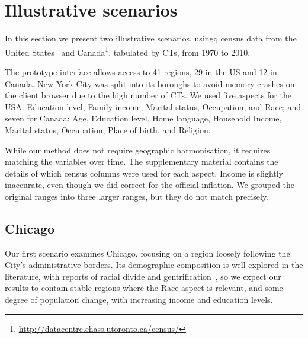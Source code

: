 \section{Illustrative scenarios}
\label{sec:study}

In this section we present two illustrative scenarios, usingq census data from
the United States~\citep{nhgis} and
Canada\footnote{\url{http://datacentre.chass.utoronto.ca/census/}}, tabulated by
CTs,  from 1970 to 2010. 

The prototype interface allows access to 41 regions, 29
in the US and 12 in Canada. New York City was split into its boroughs to avoid
memory crashes on the client browser due to the high number of CTs.  We used
five aspects for the USA: Education level, Family income, Marital status,
Occupation, and Race; and seven for Canada: Age, Education level, Home language,
Household Income, Marital status, Occupation, Place of birth, and Religion. 

While our method does not require geographic harmonisation, it requires matching
the variables over time. The supplementary material contains the details of
which census columns were used for each aspect. Income is slightly inaccurate,
even though we did correct for the official inflation. We grouped the original
ranges into three larger ranges, but they do not match precisely.


\subsection{Chicago}
Our first scenario examines Chicago, focusing on a region loosely following the
City's administrative borders. Its demographic composition is well explored in
the literature, with reports of racial divide and
gentrification~\citep{Delmelle2016,Delmelle2017,Hwang2014}, so we expect our
results to contain stable regions where the Race aspect is relevant, and some
degree of population change, with increasing income and education levels. 


